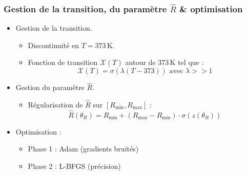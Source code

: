 \documentclass[handout]{beamer}
\newtheorem{pbm et hypo}[thm]{Problématique et hypothèses}
\begin{document}
	\begin{frame}
		\frametitle{Gestion de la transition, du paramètre $\hat{R}$ \& optimisation}
		\begin{itemize}
			\item[\maltese] Gestion de la transition.\pause
			\begin{itemize}
				\item Discontinuité en $T=373\,\mathrm{K}$.
				\item Fonction de transition $\mathcal{X}(T)$ autour de $373\,\mathrm{K}$ tel que :
				\begin{equation}
					\mathcal{X}(T) = \sigma\left(\lambda\left(T-373\right)\right) \text{ avec } \lambda >> 1
				\end{equation}
			\end{itemize}
			\item[\maltese] Gestion du paramètre $\hat{R}$.\pause
			\begin{itemize}
				\item Régularisation de $ \hat{R}$ sur $\left[R_{\text{min}}, R_{\text{max}}\right]$ : 
				\begin{equation}
					\hat{R}(\theta_R) = R_{\text{min}} + (R_{\text{max}} -  R_{\text{min}})\cdot\sigma\left(z(\theta_R)\right)
				\end{equation}
			\end{itemize}
			\item[\maltese]  Optimisation :
			\begin{itemize}
				\item Phase 1 : Adam (gradients bruités)
				\item Phase 2 : L-BFGS (précision)
			\end{itemize}
		\end{itemize}
	\end{frame}
	
\end{document}
